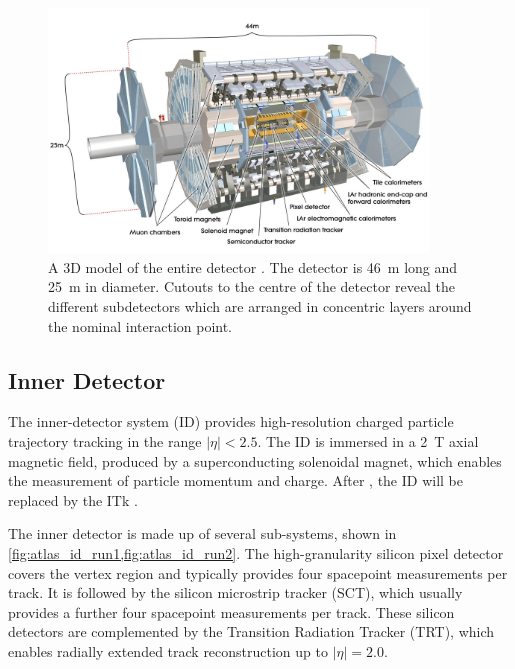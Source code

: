 \begin{figure}[!htpb]
  \centering
  \includegraphics[width=0.9\textwidth]{chapters/2.detector/figs/atlas_detector.jpg}
  \caption{
    A 3D model of the entire \ATLAS detector \cite{Jon-And:1237407}.
    The detector is \SI{46}{\meter} long and \SI{25}{\meter} in diameter.
    Cutouts to the centre of the detector reveal the different subdetectors which are arranged in concentric layers around the nominal interaction point.
  }
  \label{fig:atlas_detector}
\end{figure}


\subsection{Inner Detector}\label{sec:atlas_id}

The inner-detector system (ID) provides high-resolution charged particle trajectory tracking in the range $|\eta| < 2.5$.
The ID is immersed in a \SI{2}{\tesla} axial magnetic field, produced by a superconducting solenoidal magnet, which enables the measurement of particle momentum and charge.
After \runthree, the ID will be replaced by the ITk \cite{ATLAS-TDR-30,ATLAS-TDR-25}.

The inner detector is made up of several sub-systems, shown in \cref{fig:atlas_id_run1,fig:atlas_id_run2}.
The high-granularity silicon pixel detector covers the vertex region and typically provides four spacepoint measurements per track.
It is followed by the silicon microstrip tracker (SCT), which usually provides a further four spacepoint measurements per track.
These silicon detectors are complemented by the Transition Radiation Tracker (TRT),
which enables radially extended track reconstruction up to $|\eta| = 2.0$. 


